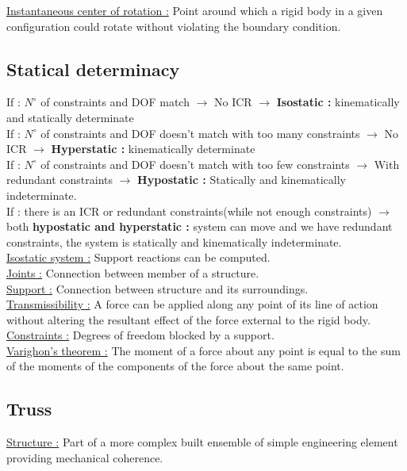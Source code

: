 \documentclass[../main.tex]{subfiles}
\begin{document}
\quad \underline{Instantaneous center of rotation :} Point around which a rigid body in a given configuration could rotate without violating the boundary condition.\\

\subsection{Statical determinacy}
If : $N^{\circ}$ of constraints and DOF match $\rightarrow$ No ICR $\rightarrow$ \textbf{Isostatic :} kinematically and statically determinate\\
If : $N^{\circ}$ of constraints and DOF doesn't match  with too many constraints $\rightarrow$ No ICR $\rightarrow$ \textbf{Hyperstatic :} kinematically determinate\\
If : $N^{\circ}$ of constraints and DOF doesn't match  with too few constraints $\rightarrow$ With redundant constraints $\rightarrow$ \textbf{Hypostatic :} Statically and kinematically indeterminate.\\

If : there is an ICR or redundant constraints(while not enough constraints) $\rightarrow$ both \textbf{hypostatic and hyperstatic :} system can move and we have redundant constraints, the system is statically and kinematically indeterminate.\\

\quad \underline{Isostatic system :} Support reactions can be computed.\\

\quad \underline{Joints :} Connection between member of a structure.\\

\quad \underline{Support :} Connection between structure and its surroundings.\\

\quad \underline{Transmissibility :} A force can be applied along any point of its line of action without altering the resultant effect of the force external to the rigid body.\\

\quad \underline{Constraints :} Degrees of freedom blocked by a support.\\

\quad \underline{Varighon's theorem :} The moment of a force about any point is equal to the sum of the moments of the components of the force about the same point.\\

\subsection{Truss}
\quad \underline{Structure :} Part of a more complex built ensemble of simple engineering element providing mechanical coherence.\\
\end{document}
